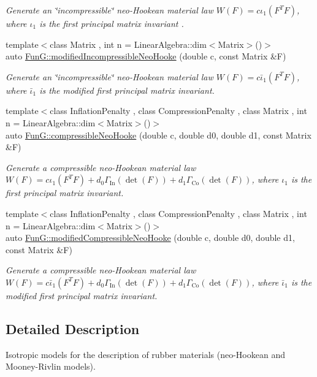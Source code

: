 \begin{DoxyCompactItemize}
\begin{DoxyCompactList}\small\item\em Generate an \char`\"{}incompressible\char`\"{} neo-\/\-Hookean material law $ W(F)=c\iota_1(F^T F) $, where $\iota_1$ is the first principal matrix invariant . \end{DoxyCompactList}\item 
\hypertarget{group__Rubber_gaf6f5ab6a379ef03d513acc5042731a01}{{\footnotesize template$<$class Matrix , int n = Linear\-Algebra\-::dim$<$\-Matrix$>$()$>$ }\\auto \hyperlink{group__Rubber_gaf6f5ab6a379ef03d513acc5042731a01}{Fun\-G\-::modified\-Incompressible\-Neo\-Hooke} (double c, const Matrix \&F)}\label{group__Rubber_gaf6f5ab6a379ef03d513acc5042731a01}

\begin{DoxyCompactList}\small\item\em Generate an \char`\"{}incompressible\char`\"{} neo-\/\-Hookean material law $ W(F)=c\bar\iota_1(F^T F) $, where $\bar\iota_1$ is the modified first principal matrix invariant. \end{DoxyCompactList}\item 
\hypertarget{group__Rubber_gac5c39cd9de55f4f0220a806cf28a7b30}{{\footnotesize template$<$class Inflation\-Penalty , class Compression\-Penalty , class Matrix , int n = Linear\-Algebra\-::dim$<$\-Matrix$>$()$>$ }\\auto \hyperlink{group__Rubber_gac5c39cd9de55f4f0220a806cf28a7b30}{Fun\-G\-::compressible\-Neo\-Hooke} (double c, double d0, double d1, const Matrix \&F)}\label{group__Rubber_gac5c39cd9de55f4f0220a806cf28a7b30}

\begin{DoxyCompactList}\small\item\em Generate a compressible neo-\/\-Hookean material law $ W(F)=c\iota_1(F^T F)+d_0\Gamma_\mathrm{In}(\det(F))+d_1\Gamma_\mathrm{Co}(\det(F)) $, where $\iota_1$ is the first principal matrix invariant. \end{DoxyCompactList}\item 
\hypertarget{group__Rubber_gac10942df03f037afdf0a81d330361a6b}{{\footnotesize template$<$class Inflation\-Penalty , class Compression\-Penalty , class Matrix , int n = Linear\-Algebra\-::dim$<$\-Matrix$>$()$>$ }\\auto \hyperlink{group__Rubber_gac10942df03f037afdf0a81d330361a6b}{Fun\-G\-::modified\-Compressible\-Neo\-Hooke} (double c, double d0, double d1, const Matrix \&F)}\label{group__Rubber_gac10942df03f037afdf0a81d330361a6b}

\begin{DoxyCompactList}\small\item\em Generate a compressible neo-\/\-Hookean material law $ W(F)=c\bar\iota_1(F^T F)+d_0\Gamma_\mathrm{In}(\det(F))+d_1\Gamma_\mathrm{Co}(\det(F)) $, where $\bar\iota_1$ is the modified first principal matrix invariant. \end{DoxyCompactList}\end{DoxyCompactItemize}


\subsection{Detailed Description}
Isotropic models for the description of rubber materials (neo-\/\-Hookean and Mooney-\/\-Rivlin models). 